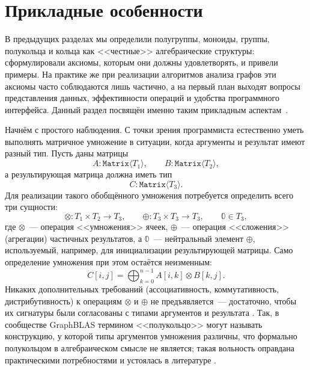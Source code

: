 \section{Прикладные особенности}
\label{sec:AppliedAspects}

В предыдущих разделах мы определили полугруппы, моноиды, группы, полукольца и кольца как <<честные>> алгебраические структуры: сформулировали аксиомы, которым они должны удовлетворять, и привели примеры.
На практике же при реализации алгоритмов анализа графов эти аксиомы часто соблюдаются лишь частично, а на первый план выходят вопросы представления данных, эффективности операций и удобства программного интерфейса.
Данный раздел посвящён именно таким прикладным аспектам~.

Начнём с простого наблюдения.
С точки зрения программиста естественно уметь выполнять матричное умножение в ситуации, когда аргументы и результат имеют разный тип.
Пусть даны матрицы
\[
    A: \texttt{Matrix}\langle T_1 \rangle, \qquad
    B: \texttt{Matrix}\langle T_2 \rangle,
\]
а результирующая матрица должна иметь тип
\[
    C: \texttt{Matrix}\langle T_3 \rangle.
\]
Для реализации такого обобщённого умножения потребуется определить всего три сущности:
\[
    \otimes: T_1 \times T_2 \to T_3, \qquad
    \oplus: T_3 \times T_3 \to T_3, \qquad
    \Bbbzero \in T_3,
\]
где $\otimes$~--- операция <<умножения>> ячеек, $\oplus$~--- операция <<сложения>> (агрегации) частичных результатов, а $\Bbbzero$~--- нейтральный элемент $\oplus$, используемый, например, для инициализации результирующей матрицы.
Само определение умножения при этом остаётся неизменным:
\[
    C[i,j] = \bigoplus_{k=0}^{n-1} A[i,k] \otimes B[k,j].
\]
Никаких дополнительных требований (ассоциативность, коммутативность, дистрибутивность) к операциям $\otimes$ и $\oplus$ не предъявляется~--- достаточно, чтобы их сигнатуры были согласованы с типами аргументов и результата%
.
Так, в сообществе GraphBLAS термином <<полукольцо>> могут называть конструкцию, у которой типы аргументов умножения различны, что формально полукольцом в алгебраическом смысле не является; такая вольность оправдана практическими потребностями и устоялась в литературе%
.

